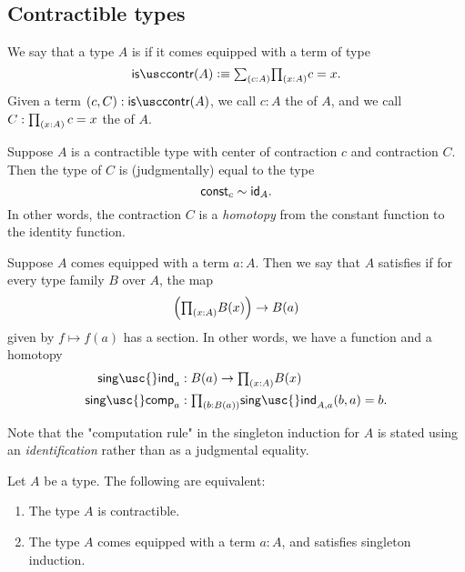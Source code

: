\subsection{Contractible types}

\begin{defn}
  We say that a type $A$ is  if it comes equipped with a term of type
  \begin{equation*}
    \iscontr(A) \defeq \sm{c:A}\prd{x:A}c=x.
  \end{equation*}
  Given a term $(c,C):\iscontr(A)$, we call $c:A$ the  of $A$, and we call $C:\prd{x:A}c=x$ the  of $A$.
\end{defn}

\begin{rmk}
Suppose $A$ is a contractible type with center of contraction $c$ and contraction $C$. Then the type of $C$ is (judgmentally) equal to the type
\begin{equation*}
\mathsf{const}_c\htpy\idfunc[A].
\end{equation*}
In other words, the contraction $C$ is a \emph{homotopy} from the constant function to the identity function.
\end{rmk}

\begin{defn}
  Suppose $A$ comes equipped with a term $a:A$. Then we say that $A$ satisfies  if for every type family $B$ over $A$, the map
\begin{equation*}
\Big(\prd{x:A}B(x)\Big)\to B(a)
\end{equation*}
given by $f\mapsto f(a)$ has a section. In other words, we have a function and a homotopy
\begin{align*}
\mathsf{sing\usc{}ind}_{a} & : B(a)\to \prd{x:A}B(x) \\
\mathsf{sing\usc{}comp}_{a} & : \prd{b:B(a)} \mathsf{sing\usc{}ind}_{A,a}(b,a)=b.
\end{align*}
\end{defn}

\begin{rmk}
  Note that the "computation rule" in the singleton induction for $A$ is stated using an \emph{identification} rather than as a judgmental equality. 
\end{rmk}

\begin{thm}\label{thm:contractible}
Let $A$ be a type. The following are equivalent:
\begin{enumerate}
\item The type $A$ is contractible.
\item The type $A$ comes equipped with a term $a:A$, and satisfies singleton induction.
\end{enumerate}
\end{thm}

